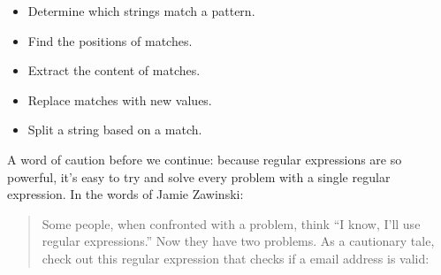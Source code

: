 \documentclass[]{book}
\providecommand{\tightlist}{%
  \setlength{\itemsep}{0pt}\setlength{\parskip}{0pt}}
\begin{document}
\begin{itemize}
\tightlist
\item
  Determine which strings match a pattern.
\item
  Find the positions of matches.
\item
  Extract the content of matches.
\item
  Replace matches with new values.
\item
  Split a string based on a match.
\end{itemize}

A word of caution before we continue: because regular expressions are so powerful, it's easy to try and solve every problem with a single regular expression. In the words of Jamie Zawinski:

\begin{quote}
Some people, when confronted with a problem, think ``I know, I'll use regular
expressions.'' Now they have two problems.
As a cautionary tale, check out this regular expression that checks if a email address is valid:
\end{quote}
\end{document}
